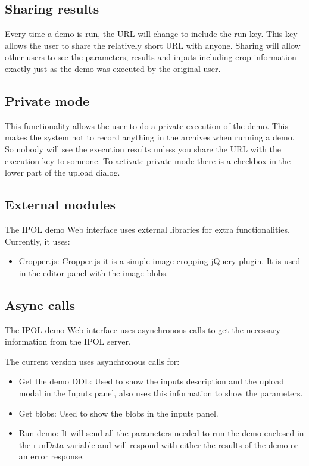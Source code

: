 
\subsection{Sharing results}
Every time a demo is run, the URL will change to include the run key. This key allows the user to share the relatively short URL 
with anyone. Sharing will allow other users to see the parameters, results and inputs including crop information exactly just as the 
demo was executed by the original user. 

\subsection{Private mode}
This functionality allows the user to do a private execution of the demo. This makes the system not to record anything in the archives when running 
a demo. So nobody will see the execution results unless you share the URL with the execution key to someone. To activate private 
mode there is a checkbox in the lower part of the upload dialog.

\subsection{External modules}

The IPOL demo Web interface uses external libraries for extra functionalities.
Currently, it uses:

\begin{itemize}
\item Cropper.js: Cropper.js it is a simple image cropping jQuery plugin. It is used in the editor panel with the image blobs.
\end{itemize}


\subsection{Async calls}
The IPOL demo Web interface uses asynchronous calls to get the necessary information from the IPOL server.

The current version uses asynchronous calls for:
\begin{itemize}
\item Get the demo DDL: Used to show the inputs description and the upload modal in the Inputs panel, also uses this information to show the parameters.
\item Get blobs: Used to show the blobs in the inputs panel.
\item Run demo: It will send all the parameters needed to run the demo enclosed in the runData variable and will respond with either the results of 
the demo or an error response.
\end{itemize}


